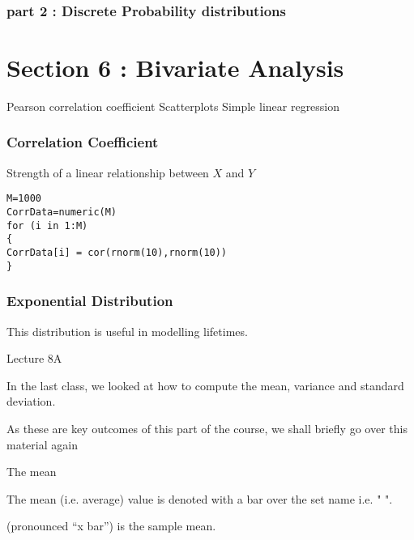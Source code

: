 \documentclass[]{report}
\begin{document}
{{{{{\subsubsection{part 2 : Discrete Probability distributions}








\section{Section 6 : Bivariate Analysis}

Pearson correlation coefficient
Scatterplots
Simple linear regression


\subsubsection{Correlation Coefficient}
Strength of a linear relationship between $X$ and $Y$

\begin{framed}
\begin{verbatim}
M=1000
CorrData=numeric(M)
for (i in 1:M)
{
CorrData[i] = cor(rnorm(10),rnorm(10))
}
\end{verbatim}
\end{framed}


\subsubsection{Exponential Distribution}

This distribution is useful in modelling lifetimes.



Lecture 8A

In the last class, we looked at how to compute the mean, variance and standard deviation. 

As these are key outcomes of this part of the course, we shall briefly go over this material again 


The mean

The mean (i.e. average) value is denoted with a bar over the set name i.e. " ".



(pronounced “x bar”)  is the sample mean.




}}}}}
\end{document}
